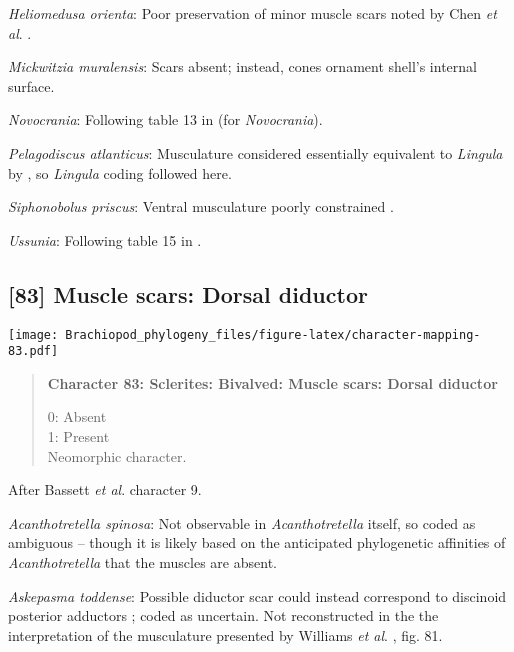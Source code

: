 \documentclass[openany]{book}
\theoremstyle{definition}
\theoremstyle{definition}
\theoremstyle{definition}
\theoremstyle{remark}
\begin{document}
\hypertarget{Heliomedusa_orienta-coding-82}{}
\emph{Heliomedusa orienta}: Poor preservation of minor muscle scars
noted by Chen \emph{et al}. \citeyearpar{Chen2007Reinterpretationof}.

\hypertarget{Mickwitzia_muralensis-coding-82}{}
\emph{Mickwitzia muralensis}: Scars absent; instead, cones ornament
shell's internal surface.

\hypertarget{Novocrania-coding-82}{}
\emph{Novocrania}: Following table 13 in
\citet{Williams2000LinguliformeaCraniiformea} (for \emph{Novocrania}).

\hypertarget{Pelagodiscus_atlanticus-coding-82}{}
\emph{Pelagodiscus atlanticus}: Musculature considered essentially
equivalent to \emph{Lingula} by
\citet{Williams2000LinguliformeaCraniiformea}, so \emph{Lingula} coding
followed here.

\hypertarget{Siphonobolus_priscus-coding-82}{}
\emph{Siphonobolus priscus}: Ventral musculature poorly constrained
\citep{Williams2000LinguliformeaCraniiformea, Popov2009Earlyontogeny}.

\hypertarget{Ussunia-coding-82}{}
\emph{Ussunia}: Following table 15 in
\citet{Williams2000LinguliformeaCraniiformea}.

\subsection*{{[}83{]} Muscle scars: Dorsal
diductor}\label{muscle-scars-dorsal-diductor}

\texttt{[image: Brachiopod\_phylogeny\_files/figure-latex/character-mapping-83.pdf]}

\begin{quote}
\textbf{Character 83: Sclerites: Bivalved: Muscle scars: Dorsal
diductor}

0: Absent\\
1: Present\\
Neomorphic character.
\end{quote}

After Bassett \emph{et al}.
\citeyearpar{Bassett2001Functionalmorphology} character 9.

\hypertarget{Acanthotretella_spinosa-coding-83}{}
\emph{Acanthotretella spinosa}: Not observable in \emph{Acanthotretella}
itself, so coded as ambiguous -- though it is likely based on the
anticipated phylogenetic affinities of \emph{Acanthotretella} that the
muscles are absent.

\hypertarget{Askepasma_toddense-coding-83}{}
\emph{Askepasma toddense}: Possible diductor scar could instead
correspond to discinoid posterior adductors
\citep{Williams1998Thediversity}; coded as uncertain. Not reconstructed
in the the interpretation of the musculature presented by Williams
\emph{et al}. \citeyearpar{Williams2000LinguliformeaCraniiformea}, fig.
81.
\end{document}
